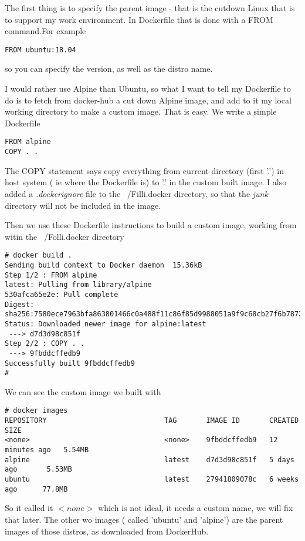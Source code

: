 \documentclass{article}  %
\begin{document}
The first thing is to specify the parent image - that is the cutdown Linux that is to support my work environment. In Dockerfile that is done with a FROM command.For example
\begin{verbatim}
FROM ubuntu:18.04
\end{verbatim}
so you can specify the version, as well as the distro name.

 I would rather use Alpine than Ubuntu, so what I want to tell my Dockerfile to do is to fetch from docker-hub a cut down Alpine image, and add to it my local working directory to make a custom image. That is easy. We write a simple Dockerfile
\begin{verbatim}
FROM alpine
COPY . .
\end{verbatim}
The COPY statement says copy everything from current directory (first '.') in host system ( ie where the Dockerfile is) to '.' in the custom built image.
I also added a {\em .dockerignore} file to the ~/Filli.docker directory, so that the {\em junk} directory will not be included in the image.

Then we use these Dockerfile instructions to build a custom image, working from witin the ~/Folli.docker directory
\begin{verbatim}
# docker build .
Sending build context to Docker daemon  15.36kB
Step 1/2 : FROM alpine
latest: Pulling from library/alpine
530afca65e2e: Pull complete 
Digest: sha256:7580ece7963bfa863801466c0a488f11c86f85d9988051a9f9c68cb27f6b7872
Status: Downloaded newer image for alpine:latest
 ---> d7d3d98c851f
Step 2/2 : COPY . .
 ---> 9fbddcffedb9
Successfully built 9fbddcffedb9
# 
\end{verbatim}
We can see the custom image we built with
\begin{verbatim}
# docker images
REPOSITORY                            TAG       IMAGE ID       CREATED          SIZE
<none>                                <none>    9fbddcffedb9   12 minutes ago   5.54MB
alpine                                latest    d7d3d98c851f   5 days ago       5.53MB
ubuntu                                latest    27941809078c   6 weeks ago      77.8MB
\end{verbatim}

So it called it $<none>$ which is not ideal, it needs a custom name, we will fix that later. The other wo images ( called 'ubuntu' and 'alpine') are the parent images of those distros, as downloaded from DockerHub.
\end{document}
